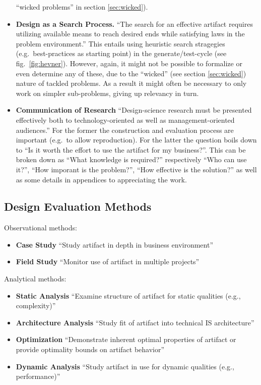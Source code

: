 \documentclass[a4paper,,tablecaptionabove]{scrbook}
\providecommand{\tightlist}{%
  \setlength{\itemsep}{0pt}\setlength{\parskip}{0pt}}
\begin{document}
\begin{itemize}
  \enquote{wicked problems} in section \ref{sec:wicked}).
\item
  \textbf{Design as a Search Process.} \enquote{The search for an
  effective artifact requires utilizing available means to reach desired
  ends while satisfying laws in the problem environment.} This entails
  using heuristic search stragegies (e.g.~best-practices as starting
  point) in the generate/test-cycle (see fig.~\ref{fig:hevner}).
  However, again, it might not be possible to formalize or even
  determine any of these, due to the \enquote{wicked} (see section
  \ref{sec:wicked}) nature of tackled problems. As a result it might
  often be necessary to only work on simpler sub-problems, giving up
  relevancy in turn.
\item
  \textbf{Communication of Research} \enquote{Design-science research
  must be presented effectively both to technology-oriented as well as
  management-oriented audiences.} For the former the construction and
  evaluation process are important (e.g.~to allow reproduction). For the
  latter the question boils down to \enquote{Is it worth the effort to
  use the artifact for my business?}. This can be broken down as
  \enquote{What knowledge is required?} respectively \enquote{Who can
  use it?}, \enquote{How imporant is the problem?}, \enquote{How
  effective is the solution?} as well as some details in appendices to
  appreciating the work.
\end{itemize}

\hypertarget{design-evaluation-methods}{%
\subsection{Design Evaluation Methods}\label{design-evaluation-methods}}

Observational methods:

\begin{itemize}
\tightlist
\item
  \textbf{Case Study} \enquote{Study artifact in depth in business
  environment} 
\item
  \textbf{Field Study} \enquote{Monitor use of artifact in multiple
  projects} 
\end{itemize}

Analytical methods:

\begin{itemize}
\tightlist
\item
  \textbf{Static Analysis} \enquote{Examine structure of artifact for
  static qualities (e.g., complexity)} 
\item
  \textbf{Architecture Analysis} \enquote{Study fit of artifact into
  technical IS architecture} 
\item
  \textbf{Optimization} \enquote{Demonstrate inherent optimal properties
  of artifact or provide optimality bounds on artifact behavior}
\item
  \textbf{Dynamic Analysis} \enquote{Study artifact in use for dynamic
  qualities (e.g., performance)}
\end{itemize}
\end{document}

